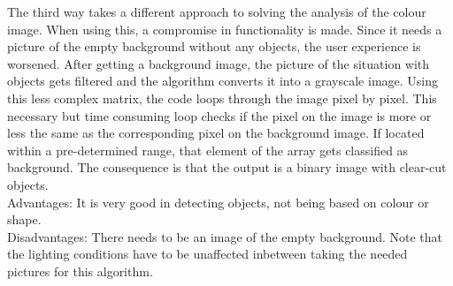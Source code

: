 \documentclass[11pt]{article}
\begin{document}
The third way takes a different approach to solving the analysis of the colour image. When using this, a compromise in functionality is made. Since it needs a picture of the empty background without any objects, the user experience is worsened. After getting a background image, the picture of the situation with objects gets filtered and the algorithm converts it into a grayscale image. Using this less complex matrix, the code loops through the image pixel by pixel. This necessary but time consuming loop checks if the pixel on the image is more or less the same as the corresponding pixel on the background image. If located within a pre-determined range, that element of the array gets classified as background. The consequence is that the output is a binary image with clear-cut objects.
\\Advantages: It is very good in detecting objects, not being based on colour or shape.
\\Disadvantages: There needs to be an image of the empty background. Note that the lighting conditions have to be unaffected inbetween taking the needed pictures for this algorithm.
\end{document}
